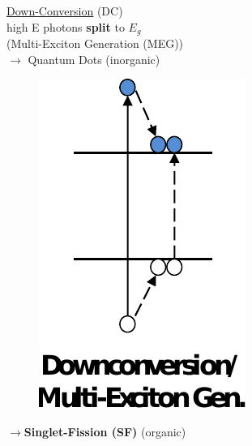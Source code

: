 \documentclass[compress]{beamer}
\begin{document}
\begin{frame}
\begin{multicols}{2}
\underline{Down-Conversion} (DC)\\
high E photons \textbf{split} to $E_g$\\
\footnotesize(Multi-Exciton Generation (MEG))\\
\small
$\rightarrow$ Quantum Dots (inorganic)\\
\begin{multicols}{2}
\vspace{-30pt}\begin{figure}[H]
\vspace{-10pt}\includegraphics[width=0.6\columnwidth]{../img/SF_esq12.pdf}
\end{figure}
\hspace{-10pt}$\rightarrow$\textbf{Singlet-Fission (SF)} (organic) \\

\end{multicols}

\end{multicols}
\end{frame}
\end{document}
